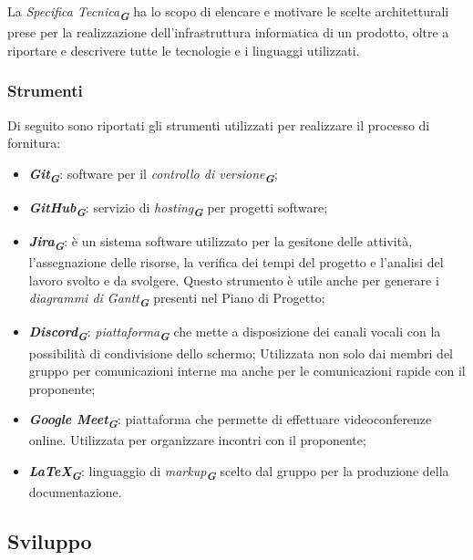 La \emph{Specifica Tecnica}\textsubscript{\textit{\textbf{G}}} ha lo scopo di elencare e motivare le scelte architetturali prese per
la realizzazione dell’infrastruttura informatica di un prodotto, oltre a riportare e descrivere tutte le tecnologie e i linguaggi utilizzati.


\subsubsection{Strumenti}

Di seguito sono riportati gli strumenti utilizzati per realizzare il processo di fornitura:
\begin{itemize}
    \item \textbf{\emph{Git}}\textsubscript{\textit{\textbf{G}}}: software per il \emph{controllo di versione}\textsubscript{\textit{\textbf{G}}};
    \item \textbf{\emph{GitHub}}\textsubscript{\textit{\textbf{G}}}: servizio di \emph{hosting}\textsubscript{\textit{\textbf{G}}} per progetti software;
    \item \textbf{\emph{Jira}}\textsubscript{\textit{\textbf{G}}}: è un sistema software utilizzato per la gesitone delle attività, l’assegnazione delle
    risorse, la verifica dei tempi del progetto e l’analisi del lavoro svolto e da svolgere.
    Questo strumento è utile anche per generare i \emph{diagrammi di Gantt}\textsubscript{\textit{\textbf{G}}} presenti nel Piano
    di Progetto;
    \item \textbf{\emph{Discord}}\textsubscript{\textit{\textbf{G}}}: \emph{piattaforma}\textsubscript{\textit{\textbf{G}}} che mette a disposizione dei canali vocali con la possibilità di condivisione dello schermo;
    Utilizzata non solo dai membri del gruppo per comunicazioni interne ma anche per le comunicazioni rapide con il proponente;
    \item \textbf{\emph{Google Meet}}\textsubscript{\textit{\textbf{G}}}: piattaforma che permette di effettuare videoconferenze online. Utilizzata per organizzare incontri con il proponente;
    \item \textbf{\emph{\LaTeX}}\textsubscript{\textit{\textbf{G}}}: linguaggio di \emph{markup}\textsubscript{\textit{\textbf{G}}} scelto dal gruppo per la produzione della documentazione.
\end{itemize}

\subsection{Sviluppo}
